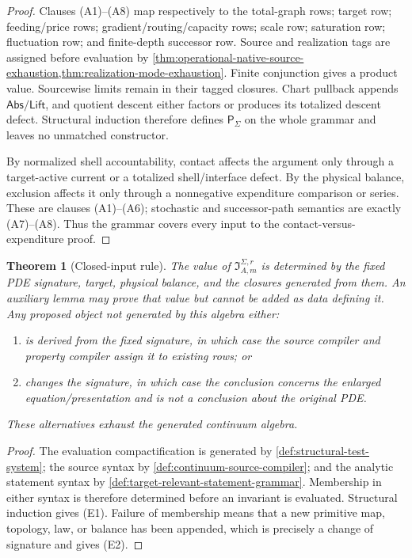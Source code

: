 \documentclass[11pt]{article}
\numberwithin{section}{part}
\theoremstyle{plain}
\newtheorem{theorem}{Theorem}[section]
\theoremstyle{definition}
\theoremstyle{remark}
\newcommand{\Abs}{\mathsf{Abs}}
\newcommand{\Lift}{\mathsf{Lift}}
\begin{document}
\begin{proof}
Clauses \textup{(A1)}--\textup{(A8)} map respectively to the total-graph
rows; target row; feeding/price rows; gradient/routing/capacity rows; scale
row; saturation row; fluctuation row; and finite-depth successor row.
Source and realization tags are assigned before evaluation by
\cref{thm:operational-native-source-exhaustion,thm:realization-mode-exhaustion}.
Finite conjunction gives a product value.  Sourcewise limits remain in their
tagged closures.  Chart pullback appends \(\Abs/\Lift\), and quotient descent
either factors or produces its totalized descent defect.  Structural
induction therefore defines \(\mathsf P_\Sigma\) on the whole grammar and
leaves no unmatched constructor.

By normalized shell accountability, contact affects the argument only through
a target-active current or a totalized shell/interface defect.  By the
physical balance, exclusion affects it only through a nonnegative expenditure
comparison or series.  These are clauses \textup{(A1)}--\textup{(A6)};
stochastic and successor-path semantics are exactly
\textup{(A7)}--\textup{(A8)}.
Thus the grammar covers every input to the contact-versus-expenditure proof.
\end{proof}

\begin{theorem}[Closed-input rule]
\label{thm:closed-input-rule}
The value of \(\mathfrak I_{A,m}^{\Sigma,r}\) is determined by the fixed PDE
signature, target, physical balance, and the closures generated from them.
An auxiliary lemma may prove that value but cannot be added as data defining
it.  Any proposed object not generated by this algebra either:
\begin{enumerate}[label=\textup{(E\arabic*)}]
\item is derived from the fixed signature, in which case the source compiler
  and property compiler assign it to existing rows; or
\item changes the signature, in which case the conclusion concerns the
  enlarged equation/presentation and is not a conclusion about the original
  PDE.
\end{enumerate}
These alternatives exhaust the generated continuum algebra.
\end{theorem}

\begin{proof}
The evaluation compactification is generated by
\cref{def:structural-test-system}; the source syntax by
\cref{def:continuum-source-compiler}; and the analytic statement syntax by
\cref{def:target-relevant-statement-grammar}.  Membership in either syntax is
therefore determined before an invariant is evaluated.  Structural induction
gives \textup{(E1)}.  Failure of membership means that a new primitive map,
topology, law, or balance has been appended, which is precisely a change of
signature and gives \textup{(E2)}.
\end{proof}
\end{document}
